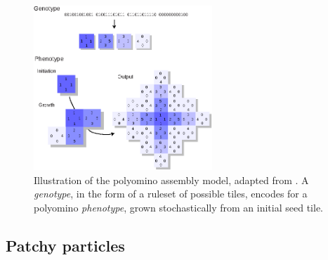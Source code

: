 
\begin{figure}[h]
    \centering\includegraphics[width=0.6\textwidth]{figures/polyominoes.eps}
    \caption{Illustration of the polyomino assembly model, adapted from \cite{johnston2011evolutionary}. A \emph{genotype}, in the form of a ruleset of possible tiles, encodes for a polyomino \emph{phenotype}, grown stochastically from an initial seed tile.}
    \label{fig:polyominoes}
\end{figure}


\subsection{Patchy particles}
